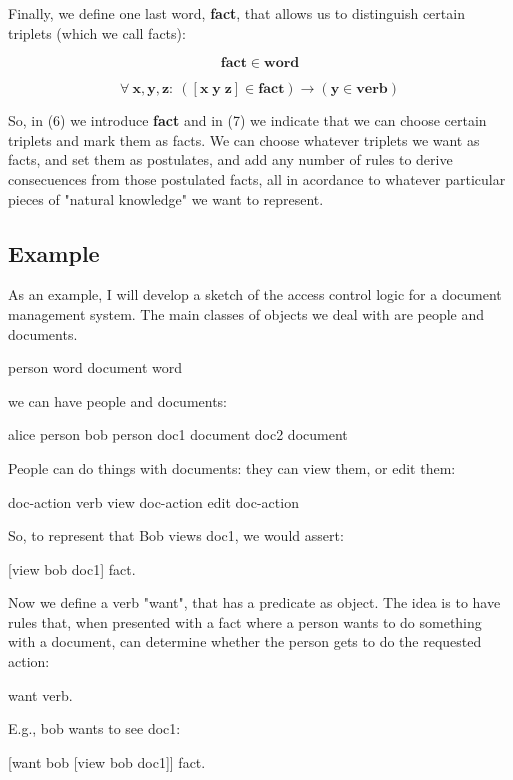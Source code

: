 \documentclass{IOS-Book-Article}     %
\begin{document}
Finally, we define one last word, \textbf{fact}, that allows us to distinguish
certain triplets (which we call facts):

\begin{equation}
\mathbf{fact\in word}
\end{equation}

\begin{equation}
\forall\:\mathbf{x\mathrm{,\mathbf{y\mathrm{,\mathbf{z}:\:\left(\left[\mathbf{x\; y\; z}\right]\in \mathbf{fact}\right)}\mathbf\rightarrow\left(\mathbf{y\in\mathbf{verb}}\right)}}}
\end{equation}

So, in (6) we introduce \textbf{fact}
and in (7) we indicate that we can choose certain triplets and mark
them as facts. We can choose whatever triplets we want as facts,
and set them as postulates, and add any number of rules
to derive consecuences from those postulated facts,
all in acordance to whatever particular pieces of "natural knowledge"
we want to represent.

\subsection{Example}

As an example, I will develop a sketch of the access control logic for a
document management system. The main classes of objects we deal with
are people and documents.

person \subseteq word
document \subseteq word

we can have people and documents:

alice \is person
bob \is person
doc1 \is document
doc2 \is document

People can do things with documents: they can view them, or edit them:

doc-action \is verb
view \subseteq doc-action
edit \subseteq doc-action

So, to represent that Bob views doc1, we would assert:

[view bob doc1] \is fact.

Now we define a verb "want", that has a predicate as object.
The idea is to have rules that, when presented with a fact
where a person wants to do something with a document,
can determine whether the  person gets to do the requested action:

want \is verb.

E.g., bob wants to see doc1:

[want bob [view bob doc1]] \is fact.
\end{document}
